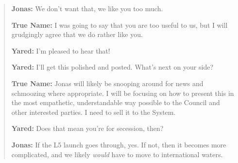 \begin{quote}
\textbf{Jonas:} We don't want that, we like you too much.

\textbf{True Name:} I was going to say that you are too useful to us, but I will grudgingly agree that we do rather like you.

\textbf{Yared:} I'm pleased to hear that!

\textbf{Yared:} I'll get this polished and posted. What's next on your side?

\textbf{True Name:} Jonas will likely be snooping around for news and schmoozing where appropriate. I will be focusing on how to present this in the most empathetic, understandable way possible to the Council and other interested parties. I need to sell it to the System.

\textbf{Yared:} Does that mean you're for secession, then?

\textbf{Jonas:} If the L5 launch goes through, yes. If not, then it becomes more complicated, and we likely \emph{would} have to move to international waters.
\end{quote}

